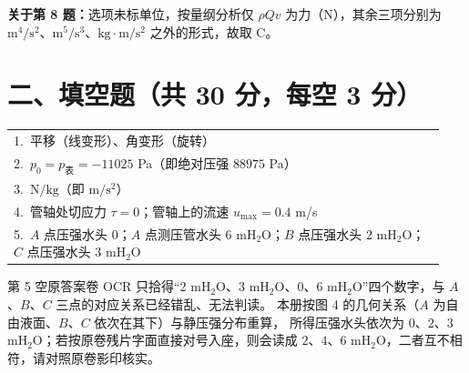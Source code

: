 \begin{tishi}
\textbf{关于第 8 题：}选项未标单位，按量纲分析仅 $\rho Qv$ 为力（$\mathrm{N}$），其余三项分别为
$\mathrm{m^4/s^2}$、$\mathrm{m^5/s^3}$、$\mathrm{kg\cdot m/s^2}$ 之外的形式，故取 C。
\end{tishi}

\section{二、填空题（共 30 分，每空 3 分）}

\begin{center}
\begin{tabular}{@{}p{0.94\linewidth}@{}}
1.\ 平移（线变形）、角变形（旋转） \tabularnewline
2.\ $p_0=p_{\text{表}}=-11025$ Pa（即绝对压强 $88975$ Pa） \tabularnewline
3.\ $\mathrm{N/kg}$（即 $\mathrm{m/s^2}$） \tabularnewline
4.\ 管轴处切应力 $\tau=0$；管轴上的流速 $u_{\max}=0.4$ m/s \tabularnewline
5.\ $A$ 点压强水头 $0$；$A$ 点测压管水头 $6$ mH$_2$O；$B$ 点压强水头 $2$ mH$_2$O；$C$ 点压强水头 $3$ mH$_2$O \tabularnewline
\end{tabular}
\end{center}

\begin{tishi}
第 5 空原答案卷 OCR 只拾得“2 mH$_2$O、3 mH$_2$O、0、6 mH$_2$O”四个数字，与 $A$、$B$、$C$ 三点的对应关系已经错乱、无法判读。
本册按图 4 的几何关系（$A$ 为自由液面、$B$、$C$ 依次在其下）与静压强分布重算，
所得压强水头依次为 $0$、$2$、$3$ mH$_2$O；若按原卷残片字面直接对号入座，则会读成 $2$、$4$、$6$ mH$_2$O，二者互不相符，请对照原卷影印核实。
\end{tishi}

